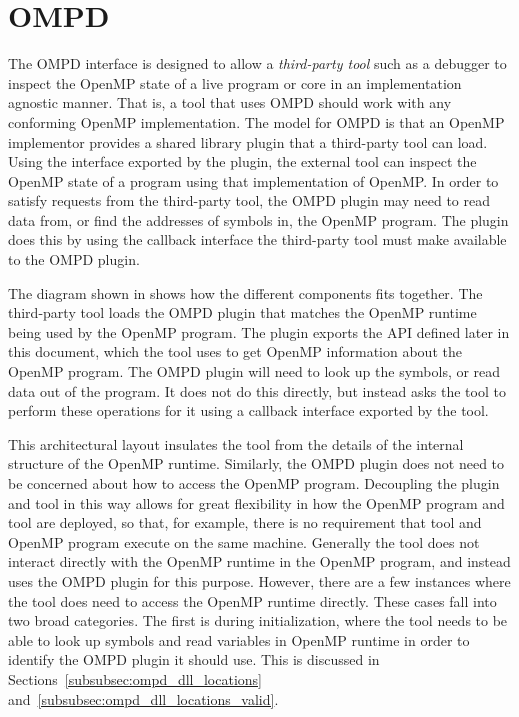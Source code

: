 \section{OMPD}
\label{sec:ompd-overview}
\label{sec:third-party-tool-callback-interface}

The OMPD interface is designed to allow a \emph{third-party tool}
such as a debugger to inspect the OpenMP state of a live program
or core in an implementation agnostic manner.
That is, a tool that uses OMPD should work with any conforming
OpenMP implementation.
The model for OMPD is that an OpenMP implementor provides a shared
library plugin that a third-party tool can load.
Using the interface exported by the plugin, the external tool can
inspect the OpenMP state of a program using that implementation of OpenMP.
In order to satisfy requests from the third-party tool, the OMPD plugin
may need to read data from, or find the addresses of symbols in,
the OpenMP program.
The plugin does this by using the callback interface the third-party
tool must make available to the OMPD plugin.

%


The diagram shown in   shows how the different
components fits together.
The third-party tool loads the OMPD plugin that matches the OpenMP runtime
being used by the OpenMP program.
The plugin exports the API defined later in this document,
which the tool uses to get OpenMP information about the OpenMP program.
The OMPD plugin will need to look up the symbols,
or read data out of the program.
It does not do this directly, but instead asks the tool to perform
these operations for it using a callback interface exported by the tool.

This architectural layout insulates the tool from the details
of the internal structure of the OpenMP runtime.
Similarly, the OMPD plugin does not need to be concerned about
how to access the OpenMP program.
Decoupling the plugin and tool in this way allows for
great flexibility in how the OpenMP program and tool are deployed,
so that, for example, there is no requirement that tool
and OpenMP program execute on the same machine.
Generally the tool does not interact directly with the OpenMP
runtime in the OpenMP program, and instead uses the OMPD plugin
for this purpose.
However, there are a few instances where the tool does need
to access the OpenMP runtime directly.
These cases fall into two broad categories.
The first is during initialization, where the tool needs
to be able to look up symbols and read variables in OpenMP runtime
in order to identify the OMPD plugin it should use.
This is discussed in Sections~\ref{subsubsec:ompd_dll_locations}
and~\ref{subsubsec:ompd_dll_locations_valid}.

